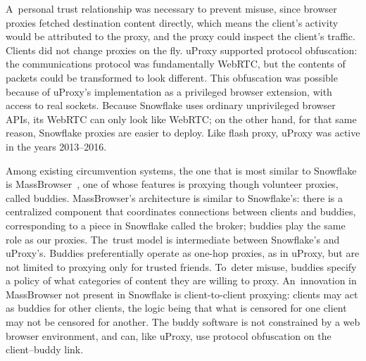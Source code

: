 \documentclass[letterpaper,twocolumn]{article}
\begin{document}
A~personal trust relationship was necessary to prevent misuse,
since browser proxies fetched destination content directly,
which means the client's activity would be attributed to the proxy,
and the proxy could inspect the client's traffic.
Clients did not change proxies on the fly.
uProxy supported protocol obfuscation:
the communications protocol was fundamentally WebRTC,
but the contents of packets could be transformed to look different.
This obfuscation was possible because of
uProxy's implementation as a privileged browser extension,
with access to real sockets.
Because Snowflake uses ordinary unprivileged browser APIs,
its WebRTC can only look like WebRTC;
on the other hand, for that same reason,
Snowflake proxies are easier to deploy.
Like flash proxy, uProxy was active in the years
2013--2016.

Among existing circumvention systems,
the one that is most similar to Snowflake is MassBrowser~\cite{Nasr2020a},
one of whose features is
proxying though volunteer proxies, called buddies.
MassBrowser's architecture is similar to Snowflake's:
there is a centralized component that coordinates
connections between clients and buddies,
corresponding to a piece in Snowflake called the broker;
buddies play the same role as our proxies.
The~trust model is intermediate between Snowflake's and uProxy's.
Buddies preferentially operate as one-hop proxies, as in uProxy,
but are not limited to proxying only for trusted friends.
To~deter misuse, buddies specify a policy of
what categories of content they are willing to proxy.
An~innovation in MassBrowser not present in Snowflake is client-to-client proxying:
clients may act as buddies for other clients,
the logic being that what is censored for one client may not be censored for another.
The buddy software is
not constrained by a web browser environment,
and can, like uProxy, use protocol obfuscation
on the client--buddy link.
\end{document}
